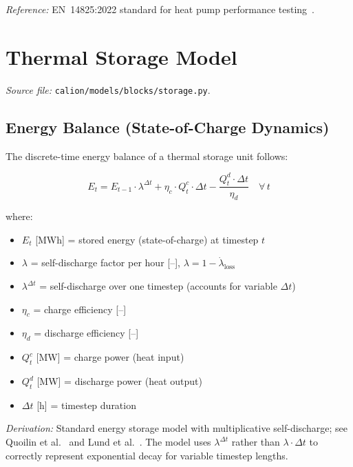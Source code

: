 \documentclass[a4paper,12pt]{article}
\begin{document}
\noindent\textit{Reference:} EN~14825:2022 standard for heat pump performance
testing~\cite{EN14825}.

\section{Thermal Storage Model}
\label{sec:storage}

\textit{Source file:} \texttt{calion/models/blocks/storage.py}.

\subsection{Energy Balance (State-of-Charge Dynamics)}

The discrete-time energy balance of a thermal storage unit follows:

\begin{equation}
  E_{t}
  = E_{t-1} \cdot \lambda^{\Delta t}
    + \eta_{c} \cdot Q^{c}_{t} \cdot \Delta t
    - \frac{Q^{d}_{t} \cdot \Delta t}{\eta_{d}}
  \quad \forall\, t
  \tag{ST-1}
  \label{eq:storage-soc}
\end{equation}

\noindent where:
\begin{itemize}
  \item $E_{t}$ [MWh] = stored energy (state-of-charge) at timestep $t$
  \item $\lambda$ = self-discharge factor per hour [--], $\lambda = 1 - \dot{\lambda}_{\text{loss}}$
  \item $\lambda^{\Delta t}$ = self-discharge over one timestep (accounts for variable $\Delta t$)
  \item $\eta_{c}$ = charge efficiency [--]
  \item $\eta_{d}$ = discharge efficiency [--]
  \item $Q^{c}_{t}$ [MW] = charge power (heat input)
  \item $Q^{d}_{t}$ [MW] = discharge power (heat output)
  \item $\Delta t$ [h] = timestep duration
\end{itemize}

\noindent\textit{Derivation:} Standard energy storage model with multiplicative
self-discharge; see Quoilin et al.~\cite{Quoilin2017} and Lund et al.~\cite{Lund2007}.
The model uses $\lambda^{\Delta t}$ rather than $\lambda \cdot \Delta t$ to correctly
represent exponential decay for variable timestep lengths.
\end{document}
